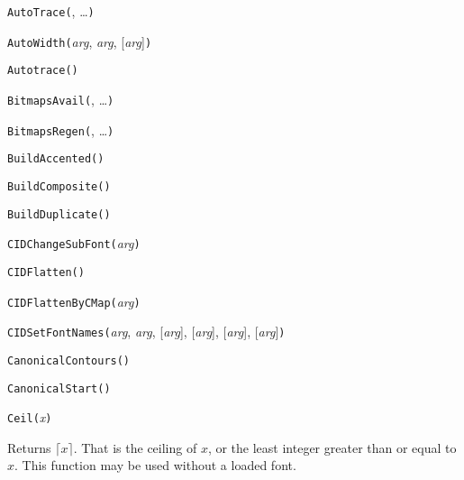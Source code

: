 
\noindent\texttt{AutoTrace(}, \ldots\texttt{)}


\noindent\texttt{AutoWidth(}\textit{arg}, \textit{arg}, [\textit{arg}]\texttt{)}


\noindent\texttt{Autotrace(}\texttt{)}


\noindent\texttt{BitmapsAvail(}, \ldots\texttt{)}


\noindent\texttt{BitmapsRegen(}, \ldots\texttt{)}


\noindent\texttt{BuildAccented(}\texttt{)}


\noindent\texttt{BuildComposite(}\texttt{)}


\noindent\texttt{BuildDuplicate(}\texttt{)}


\noindent\texttt{CIDChangeSubFont(}\textit{arg}\texttt{)}


\noindent\texttt{CIDFlatten(}\texttt{)}


\noindent\texttt{CIDFlattenByCMap(}\textit{arg}\texttt{)}


\noindent\texttt{CIDSetFontNames(}\textit{arg}, \textit{arg}, [\textit{arg}], [\textit{arg}], [\textit{arg}], [\textit{arg}]\texttt{)}


\noindent\texttt{CanonicalContours(}\texttt{)}


\noindent\texttt{CanonicalStart(}\texttt{)}


\noindent\texttt{Ceil(}\textit{x}\texttt{)}

Returns $\lceil x \rceil$.  That is the ceiling of $x$, or the least
integer greater than or equal to $x$.  This function may be used without a
loaded font.

